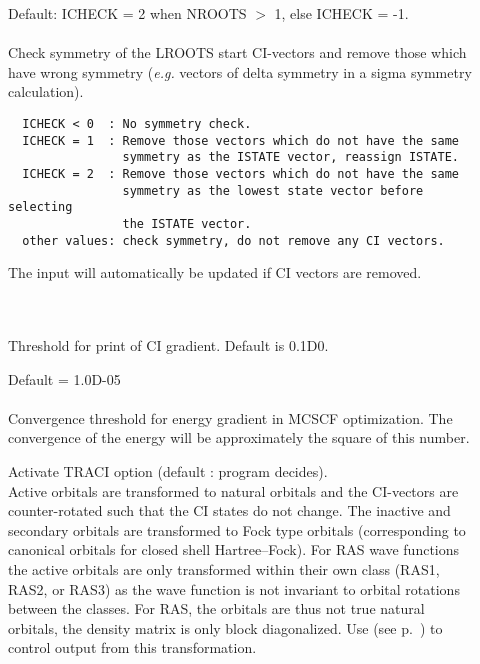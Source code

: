 \begin{description}
\item[]
  Default: ICHECK = 2 when NROOTS $>$ 1, else ICHECK = -1.\\
   \\
  Check symmetry of the LROOTS start CI-vectors and remove those which
  have wrong symmetry ({\it e.g.\/} vectors of delta symmetry in a sigma
  symmetry calculation).
\begin{verbatim}
  ICHECK < 0  : No symmetry check.
  ICHECK = 1  : Remove those vectors which do not have the same
                symmetry as the ISTATE vector, reassign ISTATE.
  ICHECK = 2  : Remove those vectors which do not have the same
                symmetry as the lowest state vector before selecting
                the ISTATE vector.
  other values: check symmetry, do not remove any CI vectors.
\end{verbatim}
  The  input will automatically be
  updated if CI vectors are removed.

\item[] \ \\
   \\
  Threshold for print of CI gradient. Default is 0.1D0.

\item[]
  Default = 1.0D-05\\
   \\
  Convergence threshold for energy gradient in MCSCF optimization.
  The convergence of the energy will be approximately the square of this
  number.

\item[]
  Activate TRACI option (default : program decides).\\
  Active orbitals are transformed to natural orbitals and the CI-vectors
  are counter-rotated such that the CI states do not change.  The
  inactive and secondary orbitals are transformed to Fock type orbitals
  (corresponding to canonical orbitals for closed shell Hartree--Fock).
  For RAS wave functions the active orbitals are only transformed
  within their own class (RAS1, RAS2, or RAS3) as the wave function is
  not invariant to orbital rotations between the classes.  For RAS, the
  orbitals are thus not true natural orbitals, the density matrix is
  only block diagonalized.  Use  (see
  p.~\pageref{ref-priinp})   to control output from this
  transformation.

\end{description}


